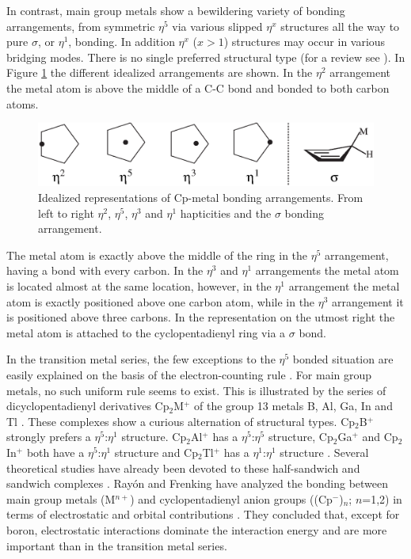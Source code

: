 In contrast, main group metals show a bewildering variety of bonding arrangements, from symmetric $\eta^{5}$ via various slipped $\eta^{x}$ structures all the way to pure $\sigma$, or $\eta^{1}$, bonding. In addition $\eta^{x}$ ($x>1$) structures may occur in various bridging modes. There is no single preferred structural type (for a review see \cite{jutzi}). In Figure \ref{ch4.fig.bondarr} the different idealized arrangements are shown. In the $\eta^2$ arrangement the metal atom is above the middle of a C-C bond and bonded to both carbon atoms.
\begin{figure}[ht]
\center
\includegraphics[scale=0.8]{cyclopentadienyl/figures/bondarrangements.eps}
\caption{Idealized representations of Cp-metal bonding arrangements. From left to right $\eta^2$, $\eta^5$, $\eta^3$ and $\eta^1$ hapticities and the $\sigma$ bonding arrangement.}
\label{ch4.fig.bondarr}
\end{figure}
The metal atom is exactly above the middle of the ring in the $\eta^5$ arrangement, having a bond with every carbon. In the $\eta^3$ and $\eta^1$ arrangements the metal atom is located almost at the same location, however, in the $\eta^1$ arrangement the metal atom is exactly positioned above one carbon atom, while in the $\eta^3$ arrangement it is positioned above three carbons. In the representation on the utmost right the metal atom is attached to the cyclopentadienyl ring via a $\sigma$ bond. 

In the transition metal series, the few exceptions to the $\eta^{5}$ bonded situation are easily explained on the basis of the electron-counting rule \cite{shriver}.
For main group metals, no such uniform rule seems to exist. This is illustrated by the series of dicyclopentadienyl derivatives Cp$_2$M$^{+}$ of the group 13 metals B, Al, Ga, In and Tl \cite{macdonald}. These complexes show a curious alternation of structural types. Cp$_2$B$^{+}$ strongly prefers a $\eta^{5}$:$\eta^{1}$ structure. Cp$_2$Al$^{+}$ has a $\eta^{5}$:$\eta^{5}$ structure, Cp$_2$Ga$^{+}$ and Cp$_2$In$^{+}$ both have a $\eta^{5}$:$\eta^{1}$ structure and Cp$_2$Tl$^{+}$ has a $\eta^{1}$:$\eta^{1}$ structure \cite{budzelaar}. Several theoretical studies have already been devoted to these half-sandwich and sandwich complexes \cite{kwon}. Ray\'{o}n and Frenking have analyzed the bonding between main group metals (M$^{n+}$) and cyclopentadienyl anion groups ((Cp$^{-}$)$_n$; $n$=1,2) in terms of electrostatic and orbital contributions \cite{rayon}. They concluded that, except for boron, electrostatic interactions dominate the interaction energy and are more important than in the transition metal series.

